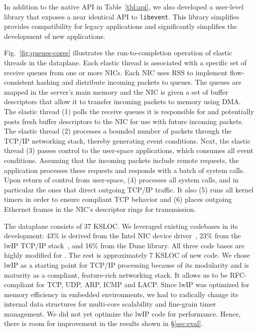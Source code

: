 In addition to the native API in Table~\ref{tbl:api}, we also
developed a user-level library that exposes a near identical API to
\texttt{libevent}. This library simplifies provides compatibility for
legacy applications and significantly simplifies the development of
new applications. 

 

Fig.~\ref{fig:queues-cores} illustrates the run-to-completion
operation of elastic threads in the \ix dataplane. Each elastic thread
is associated with a specific set of receive queues from one or more
NICs. Each NIC uses RSS to implement flow-consistent hashing and
distribute incoming packets to queues. The queues are mapped in the
server's main memory and the NIC is given a set of buffer descriptors
that allow it to transfer incoming packets to memory using DMA.  The
elastic thread (1) polls the receive queues it is responsible for and
potentially posts fresh buffer descriptors to the NIC for use with
future incoming packets. The elastic thread (2) processes a bounded
number of packets through the TCP/IP networking stack, thereby
generating event conditions. Next, the elastic thread (3) passes
control to the user-space applications, which consumes all event
conditions. Assuming that the incoming packets include remote
requests, the application processes these requests and responds with a
batch of system calls. Upon return of control from user-space,  (4)
processes all system calls, and in particular the ones that direct
outgoing TCP/IP traffic. It also (5) runs all kernel timers in order
to ensure compliant TCP behavior and (6) places outgoing Ethernet
frames in the NIC's descriptor rings for transmission. 

The \ix dataplane consists of 37 KSLOC. We leveraged existing
codebases in its development: 43\% is derived from the Intel NIC
device driver~\cite{intel:dpdk}, 23\% from the lwIP TCP/IP
stack~\cite{dunkels2001design}, and 16\% from the Dune library.  All
three code bases are highly modified for \ix. The rest is
approximately 7 KSLOC of new code. We chose lwIP as a starting point
for TCP/IP processing because of its modularity and is maturity as a
compliant, feature-rich networking stack. It allows us to be
RFC-compliant for TCP, UDP, ARP, ICMP and LACP. Since lwIP was
optimized for memory efficiency in embedded environments, we had to
radically change its internal data structures for multi-core
scalability and fine-grain timer management. We did not yet optimize
the lwIP code for performance. Hence, there is room for improvement in
the results shown in \S\ref{sec:eval}. 


